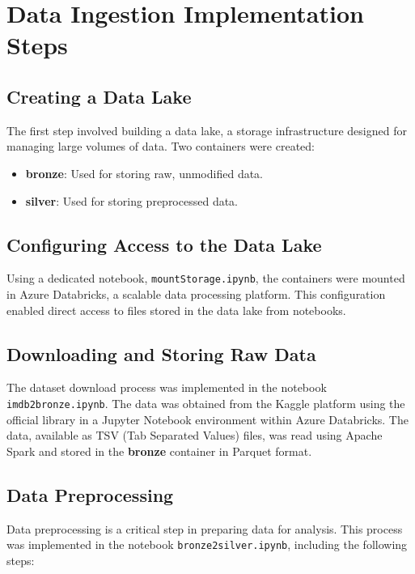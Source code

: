 \documentclass[a4paper,12pt]{article}
\begin{document}
\section{Data Ingestion Implementation Steps}

\subsection{Creating a Data Lake}
The first step involved building a data lake, a storage infrastructure designed for managing large volumes of data. Two containers were created:
\begin{itemize}
    \item \textbf{bronze}: Used for storing raw, unmodified data.
    \item \textbf{silver}: Used for storing preprocessed data.
\end{itemize}

\subsection{Configuring Access to the Data Lake}
Using a dedicated notebook, \texttt{mountStorage.ipynb}, the containers were mounted in 
Azure Databricks, a scalable data processing platform. This configuration enabled direct 
access to files stored in the data lake from notebooks.

\subsection{Downloading and Storing Raw Data}
The dataset download process was implemented in the notebook \texttt{imdb2bronze.ipynb}. The data 
was obtained from the Kaggle platform using the official library in a Jupyter Notebook environment 
within Azure Databricks. The data, available as TSV (Tab Separated Values) files, was read using 
Apache Spark and stored in the \textbf{bronze} container in Parquet format.

\subsection{Data Preprocessing}
Data preprocessing is a critical step in preparing data for analysis. This process was implemented in the notebook \texttt{bronze2silver.ipynb}, including the following steps:
\end{document}
